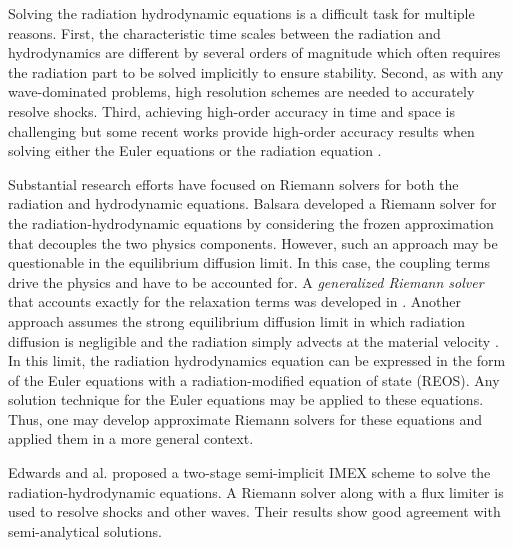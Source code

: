 \documentclass[review]{elsarticle}
\begin{document}
Solving the radiation hydrodynamic equations is a difficult task for multiple reasons. First, the characteristic time scales between the radiation and hydrodynamics are different by several orders of magnitude which often requires the radiation part to be solved implicitly to ensure stability. Second, as with any wave-dominated problems, high resolution schemes are needed to accurately resolve shocks. Third, achieving high-order accuracy in time and space is challenging but some recent works provide high-order accuracy results when solving either the Euler equations \cite{Hussaini, jlg1, jlg2, Leveque} or the radiation equation \cite{nse_ragusa_wang,jcp_ragusa_wang}. 

Substantial research efforts have focused on Riemann solvers for both the radiation and hydrodynamic equations. Balsara \cite{Balsara} developed a Riemann solver for the radiation-hydrodynamic equations by considering the frozen approximation that decouples the two physics components. However, such an approach may be questionable in the equilibrium diffusion limit. In this case, the coupling terms drive the physics and have to be accounted for. A \emph{generalized Riemann solver} that accounts exactly for the relaxation terms was developed in \cite{Balsara}. Another approach assumes the strong equilibrium diffusion limit in which radiation diffusion is negligible and the radiation simply advects at the material velocity \cite{Woodward}. In this limit, the radiation hydrodynamics equation can be expressed in the form of the Euler equations with a radiation-modified equation of state (REOS). Any solution technique for the Euler equations may be applied to these equations. Thus, one may develop approximate Riemann solvers for these equations and applied them in a more general context. 

Edwards and al. \cite{EdwardsMorelLowrie} proposed a two-stage semi-implicit IMEX scheme to solve the radiation-hydrodynamic equations. A Riemann solver along with a flux limiter is used to resolve shocks and other waves. Their results show good agreement with semi-analytical solutions. 
\end{document}
